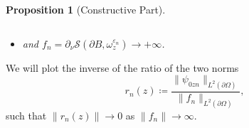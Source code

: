 \documentclass[10pt,xcolor={dvipsnames}]{beamer}
\newtheorem{proposition}[subsection]{Proposition}
\theoremstyle{plain}
\newtheorem{remark}[subsection]{Remark}
\theoremstyle{plain}
\let\epsilon\varepsilon
\begin{document}
\begin{frame}
\begin{proposition}[Constructive Part]
\begin{enumerate}
\begin{equation}
\end{equation}
  \vspace{-0.6cm}
  \begin{itemize}
   \item[$\blacktriangleright$] and $f_n = \partial_\nu\mathcal{S}(\partial B,\omega_z^{\epsilon_n})\to + \infty$.
  \end{itemize} 
\end{enumerate}
\end{proposition}
\footnotesize
We will plot the inverse of the ratio of the two norms
\begin{equation}
 r_n(z)\coloneqq\frac{\|\psi_{0zn}\|_{L^2(\partial \Omega)}}{\|f_n\|_{L^2(\partial \Omega)}},
\end{equation}
such that $\|r_n(z)\|\to 0$ as $\|f_n\|\to \infty$.


\end{frame}
\end{document}
